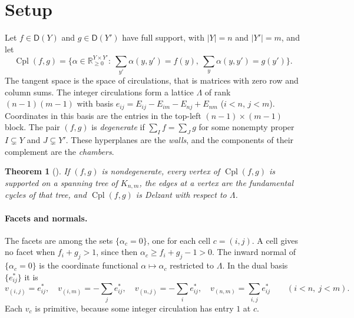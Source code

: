 \documentclass[11pt]{article}
\newtheorem{theorem}{Theorem}[section]
\theoremstyle{definition}
\theoremstyle{remark}
\newcommand{\D}{\mathsf{D}}
\newcommand{\Cpl}{\operatorname{Cpl}}
\begin{document}
\section{Setup}\label{sec:setup}

Let $f\in\D(Y)$ and $g\in\D(Y')$ have full support, with $\lvert Y\rvert=n$ and $\lvert Y'\rvert=m$, and
let
\[
\Cpl(f,g)=\Big\{\alpha\in\mathbb{R}_{\ge0}^{Y\times Y'}:\ \textstyle\sum_{y'}\alpha(y,y')=f(y),\
\sum_y\alpha(y,y')=g(y')\Big\}.
\]
The tangent space is the space of circulations, that is matrices with zero row and column sums. The
integer circulations form a lattice $\Lambda$ of rank $(n-1)(m-1)$ with basis
$e_{ij}=E_{ij}-E_{im}-E_{nj}+E_{nm}$ ($i<n$, $j<m$). Coordinates in this basis are the entries in the
top-left $(n-1)\times(m-1)$ block. The pair $(f,g)$ is \emph{degenerate} if $\sum_If=\sum_Jg$ for some
nonempty proper $I\subsetneq Y$ and $J\subsetneq Y'$. These hyperplanes are the \emph{walls}, and the
components of their complement are the \emph{chambers}.

\begin{theorem}[{\cite[Thm.~6.4]{Conditionals}}]\label{thm:delzant}
If $(f,g)$ is nondegenerate, every vertex of $\Cpl(f,g)$ is supported on a spanning tree of $K_{n,m}$,
the edges at a vertex are the fundamental cycles of that tree, and $\Cpl(f,g)$ is Delzant with respect to
$\Lambda$.
\end{theorem}

\paragraph{Facets and normals.} The facets are among the sets $\{\alpha_c=0\}$, one for each cell
$c=(i,j)$. A cell gives no facet when $f_i+g_j>1$, since then $\alpha_c\ge f_i+g_j-1>0$. The inward normal of
$\{\alpha_c=0\}$ is the coordinate functional $\alpha\mapsto\alpha_c$ restricted to $\Lambda$. In the dual basis
$\{e^*_{ij}\}$ it is
\[
v_{(i,j)}=e^*_{ij},\quad v_{(i,m)}=-\textstyle\sum_je^*_{ij},\quad v_{(n,j)}=-\sum_ie^*_{ij},\quad
v_{(n,m)}=\sum_{i,j}e^*_{ij}\qquad(i<n,\ j<m).
\]
Each $v_c$ is primitive, because some integer circulation has entry $1$ at $c$.
\end{document}
